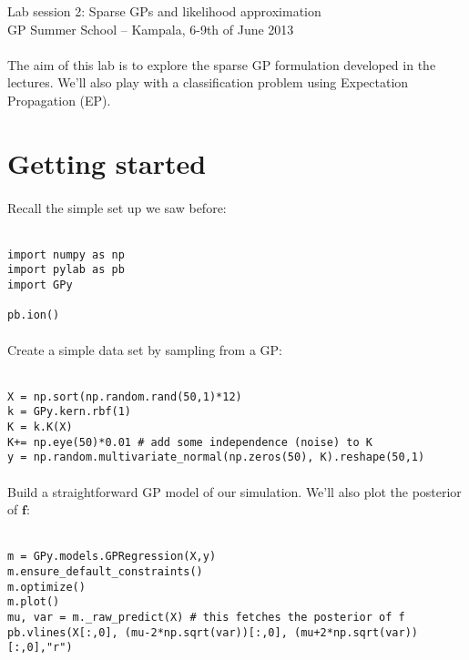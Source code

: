 \documentclass{article}
\begin{document}
\begin{center}
\textcolor{MyDarkBlue}{
	{\LARGE Lab session 2: Sparse GPs and likelihood approximation}\\
\vspace*{.5cm}
{\large GP Summer School -- Kampala, 6-9th of June 2013}
}
\end{center}
\vspace*{1cm}

\paragraph{}
The aim of this lab is to explore the sparse GP formulation developed in the lectures. We'll also play with a classification problem using Expectation Propagation (EP). 

\section{Getting started}
\paragraph{}
Recall the simple set up we saw before:\\ \ \\
\begin{verbatim}
import numpy as np
import pylab as pb
import GPy

pb.ion()
\end{verbatim}

\paragraph{}
Create a simple data set by sampling from a GP:\\ \ \\
\begin{verbatim}
X = np.sort(np.random.rand(50,1)*12)
k = GPy.kern.rbf(1)
K = k.K(X)
K+= np.eye(50)*0.01 # add some independence (noise) to K
y = np.random.multivariate_normal(np.zeros(50), K).reshape(50,1)
\end{verbatim}

\paragraph{}
Build a straightforward GP model of our simulation. We'll also plot the
posterior of $\mathbf f$:\\ \ \\
\begin{verbatim}
m = GPy.models.GPRegression(X,y)
m.ensure_default_constraints()
m.optimize()
m.plot()
mu, var = m._raw_predict(X) # this fetches the posterior of f
pb.vlines(X[:,0], (mu-2*np.sqrt(var))[:,0], (mu+2*np.sqrt(var))[:,0],"r")
\end{verbatim}
\end{document}

